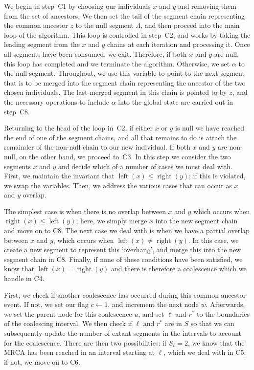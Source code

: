 \documentclass[10pt]{article}
\newcommand{\algref}[1]{#1}
\DeclareMathOperator{\segright}{right}
\DeclareMathOperator{\segleft}{left}
\begin{document}
We begin in step~\algref{C1} by choosing our individuals $x$ and $y$ and
removing them from the set of ancestors. We then set the tail of the
segment chain representing the common ancestor $z$ to the
null segment $\Lambda$, and then proceed into the main loop of the algorithm.
This loop is controlled in step~\algref{C2}, and works by taking the leading
segment from the $x$ and $y$ chains at each iteration and processing it. Once
all segments have been consumed, we exit. Therefore, if both $x$ and $y$
are null, this loop has completed and we terminate the algorithm. Otherwise, we
set $\alpha$ to the null segment. Throughout, we use this variable to point to
the next segment that is to be merged into the segment chain representing the
ancestor of the two chosen individuals. The last-merged segment in this chain
is pointed to by $z$, and the necessary operations to include $\alpha$ into
the global state are carried out in step~\algref{C8}.

Returning to the head of the loop in~\algref{C2}, if either $x$ or $y$
is null we have reached the end of one of the segment chains, and all that
remains to do is attach the remainder of the non-null chain to our new
individual. If both $x$ and $y$ are non-null, on the other hand,
we proceed to~\algref{C3}. In this step we consider the two segments $x$
and $y$ and decide which of a number of cases we must deal with.
First, we maintain the invariant that $\segleft(x) \leq
\segright(y)$; if this is violated, we swap the variables. Then, we address the
various cases that can occur as $x$ and $y$ overlap.

The simplest case is when there is no overlap between $x$ and $y$ which
occurs when $\segright(x) \leq \segleft(y)$; here, we simply merge $x$
into the new segment chain and move on to \algref{C8}. The next case
we deal with is when we have a partial overlap between $x$ and $y$,
which occurs when $\segleft(x) \neq \segright(y)$. In this case, we create
a new segment to represent this `overhang', and merge this into the
new segment chain in \algref{C8}. Finally, if none of these conditions
have been satisfied, we know that $\segleft(x) = \segright(y)$ and
there is therefore a coalescence which we handle in \algref{C4}.

First, we check if another coalescence has occurred during this
common ancestor event. If not, we set our flag $c \leftarrow 1$,
and increment the next node $w$. Afterwards, we set the parent node
for this coalescence $u$, and set $\ell$ and $r^\ast$ to the
boundaries of the coalescing interval. We then check if $\ell$
and $r^\ast$ are in $S$ so that we can subsequently update the
number of extant segments in the intervals to account for the coalescence.
There are then two possibilities: if $S_\ell = 2$, we know that the MRCA
has been reached in an interval starting at $\ell$, which we deal with
in \algref{C5}; if not, we move on to \algref{C6}.
\end{document}
